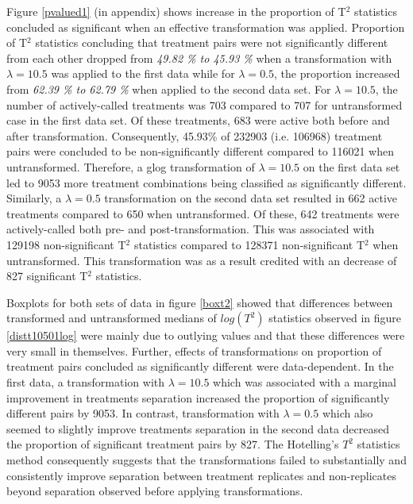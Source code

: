 \documentclass[11pt]{article}
\begin{document}
\par{Figure \ref{pvalued1} (in appendix) shows increase in the proportion of T$^2$ statistics concluded as significant when an effective transformation was applied. Proportion of T$^2$ statistics concluding that treatment pairs were not significantly different from each other dropped from \textit{49.82 \% to 45.93 \%} when a transformation with $\lambda =10.5$ was applied to the first data while for $\lambda = 0.5$, the proportion increased from \textit{62.39 \% to 62.79 \%} when applied to the second data set. For $\lambda =10.5$, the number of actively-called treatments was 703 compared to 707 for untransformed case in the first data set. Of these treatments, 683 were active both before and after transformation. Consequently, 45.93\% of 232903 (i.e. 106968) treatment pairs were concluded to be non-significantly different compared to 116021 when untransformed. Therefore,  a glog transformation of $\lambda =10.5$ on the first data set led to 9053 more treatment combinations being classified as significantly different. Similarly, a $\lambda = 0.5$ transformation on the second data set resulted in 662 active treatments compared to 650 when untransformed. Of these, 642 treatments were actively-called both pre- and post-transformation. This was associated with 129198 non-significant T$^2$ statistics compared to 128371 non-significant T$^2$ when untransformed. This transformation was as a result credited with an decrease of 827 significant T$^2$ statistics.}
\par{Boxplots for both sets of data in figure \ref{boxt2} showed that differences between transformed and untransformed medians of $log(T^2)$ statistics observed in figure \ref{distt10501log} were mainly due to outlying values and that these differences were very small in themselves. Further, effects of transformations on proportion of treatment pairs concluded as significantly different were data-dependent. In the first data, a transformation with $\lambda = 10.5$ which was associated with a marginal improvement in treatments separation increased the proportion of significantly different pairs by 9053. In contrast, transformation with $\lambda = 0.5$ which also seemed to slightly improve treatments separation in the second data decreased the proportion of significant treatment pairs by 827. The Hotelling's $T^2$ statistics method consequently suggests that the transformations failed to substantially and consistently improve separation between treatment replicates and non-replicates beyond separation observed before applying transformations.}
\end{document}
